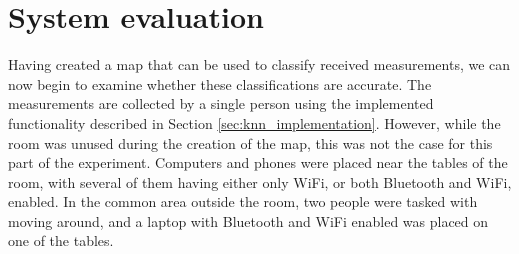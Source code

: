 \section{System evaluation}\label{sec:experiment_results}
Having created a map that can be used to classify received measurements, we can now begin to examine whether these classifications are accurate. 
The measurements are collected by a single person using the implemented functionality described in Section \ref{sec:knn_implementation}.
However, while the room was unused during the creation of the map, this was not the case for this part of the experiment. 
Computers and phones were placed near the tables of the room, with several of them having either only WiFi, or both Bluetooth and WiFi, enabled. 
In the common area outside the room, two people were tasked with moving around, and a laptop with Bluetooth and WiFi enabled was placed on one of the tables.

\begin{table}[H]
    \caption{Evaluation results from Samsung Galaxy A53 showing the number of correct classifications out of a possible ten for each k-value}
    \label{lst:resultsPhone}
\end{table}

